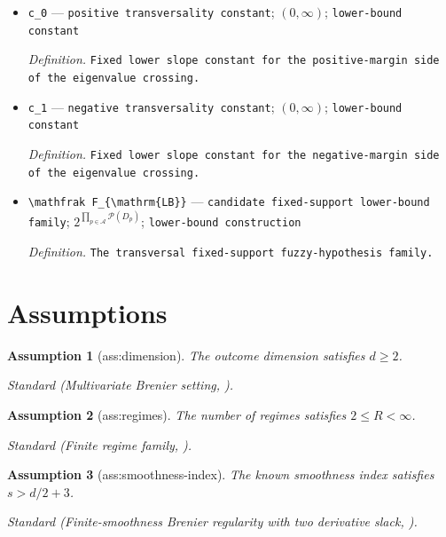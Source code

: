 \documentclass{article}
\newtheorem{assumption}{Assumption}
\begin{document}
\begin{itemize}
  \item \texttt{c\_\allowbreak{}0} --- \texttt{positive transversality constant}; \((0,\infty)\); \texttt{lower-\allowbreak{}bound constant}
  \par\smallskip\noindent\emph{Definition.} \texttt{Fixed lower slope constant for the positive-\allowbreak{}margin side of the eigenvalue crossing.}
  \item \texttt{c\_\allowbreak{}1} --- \texttt{negative transversality constant}; \((0,\infty)\); \texttt{lower-\allowbreak{}bound constant}
  \par\smallskip\noindent\emph{Definition.} \texttt{Fixed lower slope constant for the negative-\allowbreak{}margin side of the eigenvalue crossing.}
  \item \texttt{\textbackslash{}\allowbreak{}mathfrak F\_\allowbreak{}\{\textbackslash{}\allowbreak{}mathrm\{LB\}\allowbreak{}\}\allowbreak{}} --- \texttt{candidate fixed-\allowbreak{}support lower-\allowbreak{}bound family}; \(2^{\prod_{p\in\mathcal A}\mathcal P(D_p)}\); \texttt{lower-\allowbreak{}bound construction}
  \par\smallskip\noindent\emph{Definition.} \texttt{The transversal fixed-\allowbreak{}support fuzzy-\allowbreak{}hypothesis family.}
\end{itemize}

\section{Assumptions}

\begin{assumption}[ass:dimension]\label{ass:dimension}
The outcome dimension satisfies \(d\ge2\).
\par\smallskip\noindent\emph{Standard} (Multivariate Brenier setting, \cite{CarlierChernozhukovGalichon2016VQR}).
\end{assumption}

\begin{assumption}[ass:regimes]\label{ass:regimes}
The number of regimes satisfies \(2\le R<\infty\).
\par\smallskip\noindent\emph{Standard} (Finite regime family, \cite{deLaraGanassali2025GoodMatching}).
\end{assumption}

\begin{assumption}[ass:smoothness-index]\label{ass:smoothness-index}
The known smoothness index satisfies \(s>d/2+3\).
\par\smallskip\noindent\emph{Standard} (Finite-smoothness Brenier regularity with two derivative slack, \cite{ManoleBalakrishnanNilesWeedWasserman2024Plugin}).
\end{assumption}
\end{document}
